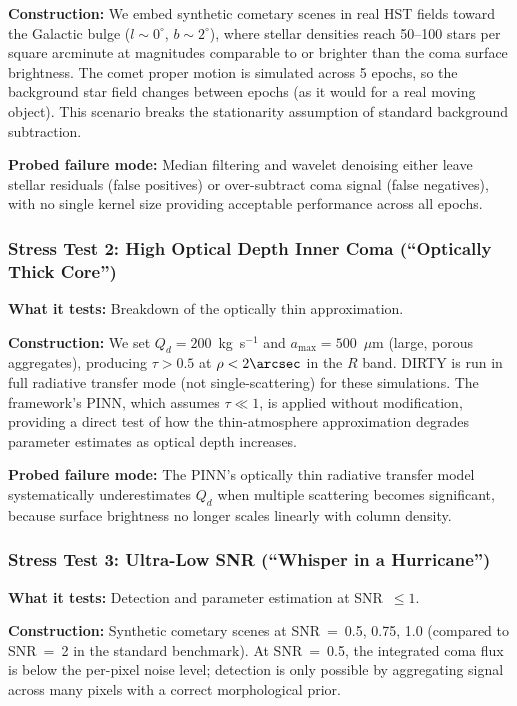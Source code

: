 \documentclass[usenatbib]{mnras}
\begin{document}
\textbf{Construction:} We embed synthetic cometary scenes in real HST fields toward the Galactic bulge ($l \sim 0^\circ$, $b \sim 2^\circ$), where stellar densities reach 50--100 stars per square arcminute at magnitudes comparable to or brighter than the coma surface brightness. The comet proper motion is simulated across 5 epochs, so the background star field changes between epochs (as it would for a real moving object). This scenario breaks the stationarity assumption of standard background subtraction.

\textbf{Probed failure mode:} Median filtering and wavelet denoising either leave stellar residuals (false positives) or over-subtract coma signal (false negatives), with no single kernel size providing acceptable performance across all epochs.

\subsubsection{Stress Test 2: High Optical Depth Inner Coma (``Optically Thick Core'')}

\textbf{What it tests:} Breakdown of the optically thin approximation.

\textbf{Construction:} We set $Q_d = 200$~kg~s$^{-1}$ and $a_{\max} = 500$~$\mu$m (large, porous aggregates), producing $\tau > 0.5$ at $\rho < 2\arcsec$ in the $R$ band. DIRTY is run in full radiative transfer mode (not single-scattering) for these simulations. The framework's PINN, which assumes $\tau \ll 1$, is applied without modification, providing a direct test of how the thin-atmosphere approximation degrades parameter estimates as optical depth increases.

\textbf{Probed failure mode:} The PINN's optically thin radiative transfer model systematically underestimates $Q_d$ when multiple scattering becomes significant, because surface brightness no longer scales linearly with column density.

\subsubsection{Stress Test 3: Ultra-Low SNR (``Whisper in a Hurricane'')}

\textbf{What it tests:} Detection and parameter estimation at SNR~$\leq 1$.

\textbf{Construction:} Synthetic cometary scenes at SNR~=~0.5, 0.75, 1.0 (compared to SNR~=~2 in the standard benchmark). At SNR~=~0.5, the integrated coma flux is below the per-pixel noise level; detection is only possible by aggregating signal across many pixels with a correct morphological prior.
\end{document}

